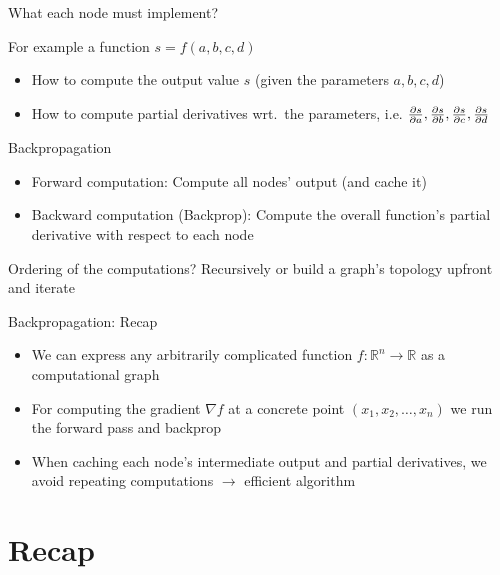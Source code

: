 \documentclass[12pt,aspectratio=169,handout]{beamer}
\begin{document}
\begin{frame}{What each node must implement?}
	
	For example a function $s = f(a, b, c, d)$
	
	\begin{itemize}
		\item How to compute the output value $s$ (given the parameters $a, b, c, d$)
		\item How to compute partial derivatives wrt.\ the parameters, i.e. $\pdv{s}{a}, \pdv{s}{b}, \pdv{s}{c}, \pdv{s}{d}$
	\end{itemize}
	
\end{frame}

\begin{frame}{Backpropagation}
	
	\begin{itemize}
		\item Forward computation: Compute all nodes' output (and cache it)
		\item Backward computation (Backprop): Compute the overall function's partial derivative with respect to each node
	\end{itemize}
	
	\bigskip
	
	Ordering of the computations? Recursively or build a graph's topology upfront and iterate
	
\end{frame}


\begin{frame}{Backpropagation: Recap}
	\begin{itemize}
		\item We can express any arbitrarily complicated function $f: \mathbb{R}^n \to \mathbb{R}$ as a computational graph
		\item For computing the gradient $\nabla f$ at a concrete point $(x_1, x_2, \ldots, x_n)$ we run the forward pass and backprop
		\item When caching each node's intermediate output and partial derivatives, we avoid repeating computations $\to$ efficient algorithm
	\end{itemize}
\end{frame}


\section*{Recap}
\end{document}
